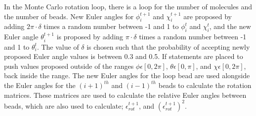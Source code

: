 \documentclass{ece}
\begin{document}
In the Monte Carlo rotation loop, there is a loop for the number of molecules and the number of beads. New Euler angles for \begin{math} \phi^{t+1}_i \end{math} and \begin{math} \chi^{t+1}_i \end{math} are proposed by adding \begin{math} 2 \pi \cdot \delta \end{math} times a random number between -1 and 1 to \begin{math} \phi^{t}_i \end{math} and \begin{math} \chi^{t}_i \end{math}, and the new Euler angle \begin{math} \theta^{t+1}_i \end{math} is proposed by adding \begin{math} \pi \cdot \delta \end{math} times a random number between -1 and 1 to \begin{math} \theta^{t}_i \end{math}. The value of \begin{math} \delta \end{math} is chosen such that the probability of accepting newly proposed Euler angle values is between 0.3 and 0.5. If statements are placed to push values proposed outside of the ranges \begin{math} \phi \epsilon [0 , 2 \pi]  \end{math}, \begin{math} \theta \epsilon [0 , \pi] \end{math}, and \begin{math} \chi \epsilon [0 , 2 \pi] \end{math}, back inside the range. The new Euler angles for the loop bead are used alongside the Euler angles for the \begin{math} (i+1)^{th} \end{math} and \begin{math} (i-1)^{th} \end{math} beads to calculate the rotation matrices. These matrices are  used to calculate the relative Euler angles between beads, which are also used to calculate; \begin{math} \epsilon_{rot}^{t+1} \end{math}, and \begin{math} ( \epsilon_{rot}^{t+1} )^2 \end{math}. 
\end{document}
